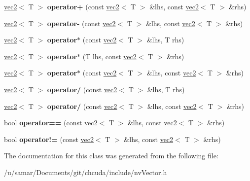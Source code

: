 \begin{DoxyCompactItemize}
\hyperlink{classnv_1_1vec2}{vec2}$<$ T $>$ {\bfseries operator+} (const \hyperlink{classnv_1_1vec2}{vec2}$<$ T $>$ \&lhs, const \hyperlink{classnv_1_1vec2}{vec2}$<$ T $>$ \&rhs)
\item 
\hypertarget{classnv_1_1vec2_ada5e7f01644574eac325648f2f25670c}{}\label{classnv_1_1vec2_ada5e7f01644574eac325648f2f25670c} 
\hyperlink{classnv_1_1vec2}{vec2}$<$ T $>$ {\bfseries operator-\/} (const \hyperlink{classnv_1_1vec2}{vec2}$<$ T $>$ \&lhs, const \hyperlink{classnv_1_1vec2}{vec2}$<$ T $>$ \&rhs)
\item 
\hypertarget{classnv_1_1vec2_acf094661268a6716a0838effa711d5fd}{}\label{classnv_1_1vec2_acf094661268a6716a0838effa711d5fd} 
\hyperlink{classnv_1_1vec2}{vec2}$<$ T $>$ {\bfseries operator$\ast$} (const \hyperlink{classnv_1_1vec2}{vec2}$<$ T $>$ \&lhs, T rhs)
\item 
\hypertarget{classnv_1_1vec2_a0d9aa669bcd9d0c4217f0be882e95bc6}{}\label{classnv_1_1vec2_a0d9aa669bcd9d0c4217f0be882e95bc6} 
\hyperlink{classnv_1_1vec2}{vec2}$<$ T $>$ {\bfseries operator$\ast$} (T lhs, const \hyperlink{classnv_1_1vec2}{vec2}$<$ T $>$ \&rhs)
\item 
\hypertarget{classnv_1_1vec2_abfa3883153adec88b629071d6214181c}{}\label{classnv_1_1vec2_abfa3883153adec88b629071d6214181c} 
\hyperlink{classnv_1_1vec2}{vec2}$<$ T $>$ {\bfseries operator$\ast$} (const \hyperlink{classnv_1_1vec2}{vec2}$<$ T $>$ \&lhs, const \hyperlink{classnv_1_1vec2}{vec2}$<$ T $>$ \&rhs)
\item 
\hypertarget{classnv_1_1vec2_a20e8cedd23c85b5a733b29d9216823eb}{}\label{classnv_1_1vec2_a20e8cedd23c85b5a733b29d9216823eb} 
\hyperlink{classnv_1_1vec2}{vec2}$<$ T $>$ {\bfseries operator/} (const \hyperlink{classnv_1_1vec2}{vec2}$<$ T $>$ \&lhs, T rhs)
\item 
\hypertarget{classnv_1_1vec2_a2ad71189de611e357baac7c2166f10cd}{}\label{classnv_1_1vec2_a2ad71189de611e357baac7c2166f10cd} 
\hyperlink{classnv_1_1vec2}{vec2}$<$ T $>$ {\bfseries operator/} (const \hyperlink{classnv_1_1vec2}{vec2}$<$ T $>$ \&lhs, const \hyperlink{classnv_1_1vec2}{vec2}$<$ T $>$ \&rhs)
\item 
\hypertarget{classnv_1_1vec2_a783e39d62df5ebca6654640dd95b6f54}{}\label{classnv_1_1vec2_a783e39d62df5ebca6654640dd95b6f54} 
bool {\bfseries operator==} (const \hyperlink{classnv_1_1vec2}{vec2}$<$ T $>$ \&lhs, const \hyperlink{classnv_1_1vec2}{vec2}$<$ T $>$ \&rhs)
\item 
\hypertarget{classnv_1_1vec2_a996c39a11242ad1431131ab6cf71e383}{}\label{classnv_1_1vec2_a996c39a11242ad1431131ab6cf71e383} 
bool {\bfseries operator!=} (const \hyperlink{classnv_1_1vec2}{vec2}$<$ T $>$ \&lhs, const \hyperlink{classnv_1_1vec2}{vec2}$<$ T $>$ \&rhs)
\end{DoxyCompactItemize}


The documentation for this class was generated from the following file\+:\begin{DoxyCompactItemize}
\item 
/u/samar/\+Documents/git/chcuda/include/nv\+Vector.\+h\end{DoxyCompactItemize}
